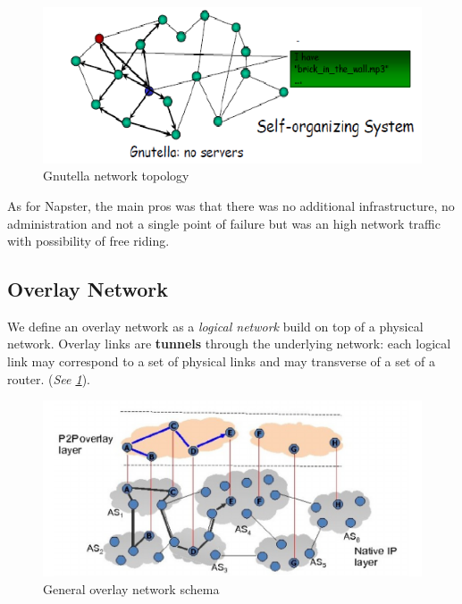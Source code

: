 \documentclass[10pt,a4paper]{report}
\begin{document}
\begin{figure}[h!]
	\centering
	\includegraphics[scale=0.70]{images/Pasted image 20230224151453.png}
	\caption{Gnutella network topology}
\end{figure}


As for Napster, the main pros was that there was no additional infrastructure, no administration and not a single point of failure but was an high network traffic with possibility of free riding.
\subsection{Overlay Network}\label{sec:overlay-network}
We define an overlay network as a \textit{logical network} build on top of a physical network. Overlay links are \textbf{tunnels} through the underlying network: each logical link may correspond to a set of physical links and may transverse of a set of a router. (\textit{See \ref{p2p-overlay}}).
\begin{figure}
	\centering
	\includegraphics[scale=0.60]{images/Pasted image 20230224151810.png}
	\caption{General overlay network schema}
	\label{p2p-overlay}
\end{figure}
\end{document}
